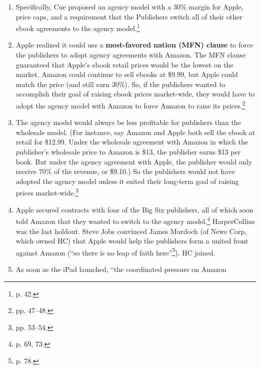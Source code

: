 \begin{enumerate}
\begin{enumerate}
        agreements with the publishers continued to use the wholesale model, 
        because Amazon could continue to undercut Apple's prices.  ``To ensure 
        that the iBookstore would be competitive at higher prices, Apple 
        concluded that it needed to eliminate all retail price competition.  
        Thus, the final component of its agency model required the Publishers to 
        move all of their e-tailers to agency.''\footnote{pp. 39--40.}
        \item Specifically, Cue proposed an agency model with a 30\% margin for 
        Apple, price caps, and a requirement that the Publishers switch all of 
        their other ebook agreements to the agency model.\footnote{p. 42.}
        \item Apple realized it could use a \textbf{most-favored nation (MFN) 
        clause} to force the publishers to adopt agency agreements with Amazon.  
        The MFN clause guaranteed that Apple's ebook retail prices would be the 
        lowest on the market. Amazon could continue to sell ebooks at \$9.99, 
        but Apple could match the price (and still earn 30\%). So, if the 
        publishers wanted to accomplish their goal of raising ebook prices 
        market-wide, they would have to adopt the agency model with Amazon to 
        force Amazon to raise its prices.\footnote{pp. 47--48.}
        \item The agency model would always be less profitable for publishers 
        than the wholesale model. (For instance, say Amazon and Apple both sell 
        the ebook at retail for \$12.99. Under the wholesale agreement with 
        Amazon in which the publisher's wholesale price to Amazon is \$13, the 
        publisher earns \$13 per book. But under the agency agreement with 
        Apple, the publisher would only receive 70\% of the revenue, or \$9.10.) 
        So the publishers would not have adopted the agency model unless it 
        suited their long-term goal of raising prices market-wide.\footnote{pp. 
        53--54.}
        \item Apple secured contracts with four of the Big Six publishers, all 
        of which soon told Amazon that they wanted to switch to the agency 
        model.\footnote{p. 69, 73.} HarperCollins was the last holdout. Steve 
        Jobs convinced James Murdoch (of News Corp, which owned HC) that
        Apple would help the publishers form a united front against Amazon (``so 
        there is no leap of faith here''\footnote{p. 78.}). HC joined.
        \item As soon as the iPad launched, ``the coordinated pressure on Amazon 

\end{enumerate}
\end{enumerate}
